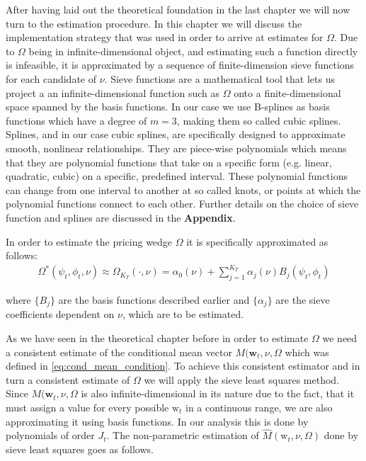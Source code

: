 \documentclass[12pt,a4paper]{article}
\begin{document}
		After having laid out the theoretical foundation in the last chapter we will now turn to the estimation procedure. In this chapter we will discuss the implementation strategy that was used in order to arrive at estimates for $\Omega$.
		Due to $\Omega$ being in infinite-dimensional object, and estimating such a function directly is infeasible, it is approximated by a sequence of finite-dimension sieve functions for each candidate of $\nu$. Sieve functions are a mathematical tool that lets us project a an infinite-dimensional function such as $\Omega$ onto a finite-dimensional space spanned by the basis functions. In our case we use B-splines as basis functions which have a degree of $m = 3$, making them so called cubic splines. Splines, and in our case cubic splines, are specifically designed to approximate smooth, nonlinear relationships. They are piece-wise polynomials which means that they are polynomial functions that take on a specific form (e.g. linear, quadratic, cubic) on a specific, predefined interval. These polynomial functions can change from one interval to another at so called knots, or points at which the polynomial functions connect to each other. Further details on the choice of sieve function and splines are discussed in the \textbf{Appendix}. 
		
		In order to estimate the pricing wedge $\Omega$ it is specifically approximated as follows: 
		\begin{align}
			\Omega^*(\psi_{t}, \phi_t, \nu) \approx \Omega_{K_T}(\cdot, \nu)
			= \alpha_0(\nu) + \sum_{j = 1}^{K_T} \alpha_j(\nu) B_j(\psi_{t}, \phi_t)
			\label{eq:approx_omega}
		\end{align}
	
		where $\{B_j\}$ are the basis functions described earlier and  $\{\alpha_j\}$ are the sieve coefficients dependent on $\nu$, which are to be estimated.
		
		As we have seen in the theoretical chapter before in order to estimate $\Omega$ we need a consistent estimate of the conditional mean vector $M(\textbf{w}_t, \nu, \Omega$ which was defined in \ref{eq:cond_mean_condition}. To achieve this consistent estimator and in turn a consistent estimate of $\Omega$ we will apply the sieve least squares method. Since $M(\textbf{w}_t, \nu, \Omega$ is also infinite-dimensional in its nature due to the fact, that it must assign a value for every possible $\text{w}_t$ in a continuous range, we are also approximating it using basis functions. In our analysis this is done by polynomials of order $J_t$. The non-parametric estimation of $\hat{M}(\text{w}_t, \nu, \Omega)$ done by sieve least squares goes as follows. 
		
\end{document}
